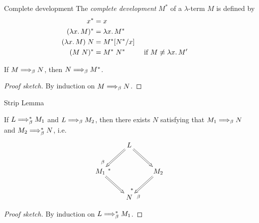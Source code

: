 \begin{frame}{Complete development}
  The \emph{complete development} $M^*$ of a $\lambda$-term $M$ is defined by
  \begin{align*}
    x^*      & = x \\
    (\lambda x.\, M)^* & = \lambda x.\, M^* \\
    (\lambda x.\, M)\;N & = M^*[{N^*}/{x}] \\
    (M\;N)^* & = M^*\;N^* && \text{ if $M \not\equiv \lambda x.\,M'$ } 
  \end{align*}
  \begin{theorem}
    If $M \Longrightarrow_{\beta} N$, then $N \Longrightarrow_{\beta} M^*$.
  \end{theorem}
  \begin{proof}[Proof sketch]
    By induction on $M \Longrightarrow_{\beta} N$.
    
  \end{proof}
\end{frame}

\begin{frame}{Strip Lemma}
  \begin{theorem}
    If $L \Longrightarrow_{\beta}^* M_1$ and $L \Longrightarrow_{\beta} M_2$, then there exists $N$
    satisfying that $M_1 \Longrightarrow_{\beta} N$ and $M_2 \Longrightarrow_{\beta}^* N$, i.e.\
    \[
      \xymatrix{
        & L \ar@{=>}[rd] \ar@{=>}[ld]^(.8){*}_(.8){\beta} \\
        M_1 \ar@{=>}[rd] & & M_2 \ar@{=>}[ld]_(.8){*}^(.8){\beta} \\
            & N
      }
    \]
  \end{theorem}
  \begin{proof}[Proof sketch]
    By induction on $L \Longrightarrow_{\beta}^* M_1$. 
  \end{proof}
\end{frame}


